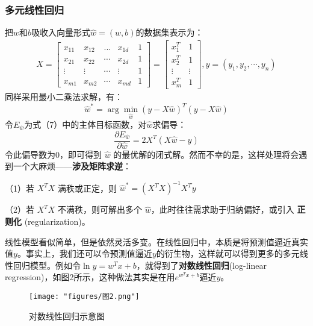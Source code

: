 \subsubsection{多元线性回归}
把$w$和$b$吸收入向量形式$\hat{w}=(w,b)$的数据集表示为：
\begin{equation}\begin{gathered}X=\begin{bmatrix}x_{11}&x_{12}&...&x_{1d}&1\\x_{21}&x_{22}&\cdots&x_{2d}&1\\\vdots&\vdots&\cdots&\vdots&1\\x_{m1}&x_{m2}&\cdots&x_{md}&1\end{bmatrix}=\begin{bmatrix}x_1^T&1\\x_2^T&1\\\vdots&\vdots\\x_m^T&1\end{bmatrix},y=(y_1,y_2,\cdots,y_n)\end{gathered}\end{equation}
同样采用最小二乘法求解，有：
\begin{equation}\hat{w}^*=\arg\min_{\hat{w}}(y-X\hat{w})^T(y-X\hat{w})\end{equation}
令$E_{\hat{w}}$为式（7）中的主体目标函数，对$\hat{w}$求偏导：
\begin{equation}\frac{\partial E_{\hat{w}}}{\partial\hat{w}}=2X^T(X\hat{w}-y)\end{equation}
令此偏导数为0，即可得到 $\hat{w}$ 的最优解的闭式解。然而不幸的是，这样处理将会遇到一个大麻烦——\textbf{涉及矩阵求逆}：

\newline %
（1）若 $X^{T}X$ 满秩或正定，则 $\hat{w}^{*} = (X^{T}X)^{-1}X^{T}y$

\newline %
（2）若 $X^{T}X$ 不满秩，则可解出多个 $\hat{w}$，此时往往需求助于归纳偏好，或引入 \textbf{正则化} (regularization)。
\newline %

线性模型看似简单，但是依然灵活多变。在线性回归中，本质是将预测值逼近真实值$y$。事实上，我们还可以令预测值逼近$y$的衍生物，这样就可以得到更多的多元线性回归模型。例如令$\ln y=w^Tx+b$，就得到了\textbf{对数线性回归}(log-linear regression)，如图2所示，这种做法其实是在用$e^{w^Tx+b}$逼近$y$。

\begin{figure}[t] 
	\centering
	\texttt{[image: "figures/图2.png"]} %
	\caption{对数线性回归示意图} %
	\label{fig:example} %
\end{figure}

